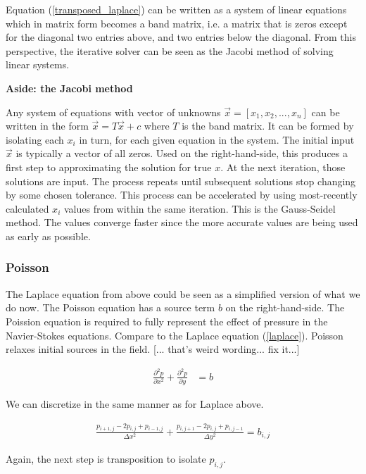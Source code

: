 \documentclass[11pt]{article}
\begin{document}
{Equation (\ref{transposed_laplace}) can be written as a system of linear equations which in
matrix form becomes a band matrix, i.e. a matrix that is zeros except for the diagonal
two entries above, and two entries below the diagonal. From this perspective, the iterative
solver can be seen as the Jacobi method of solving linear systems.

\textbf{Aside: the Jacobi method}

Any system of equations with vector of unknowns $\vec{x} = [x_1, x_2,... ,x_n]$ can be written
in the form $\vec{x} = T\vec{x} + c$ where $T$ is the band matrix. It can be formed by
isolating each $x_i$ in turn, for each given equation in the system. The initial input $\vec{x}$
is typically a vector of all zeros. Used on the right-hand-side, this produces a first step
to approximating the solution for true $x$. At the next iteration, those solutions are input.
The process repeats until subsequent solutions stop changing by some chosen tolerance.
This process can be accelerated by using most-recently calculated $x_i$ values from
within the same iteration. This is the Gauss-Seidel method. The values converge faster since
the more accurate values are being used as early as possible.

\subsubsection{Poisson}
The Laplace equation from above could be seen as a simplified version of what we do now.
The Poisson equation has a source term $b$ on the right-hand-side.
The Poission equation is required to fully represent the effect of pressure in
the Navier-Stokes equations. Compare to the Laplace equation (\ref{laplace}).
Poisson relaxes initial sources in the field.
[... that's weird wording... fix it...]

\begin{align}
\frac{\partial^2 p}{\partial x^2} + \frac{\partial^2 p}{\partial y} &= b
\label{poisson}
\end{align}

We can discretize in the same manner as for Laplace above.

\begin{align}
\frac{p_{i+1,j} - 2p_{i,j} + p_{i-1,j}}{\Delta x^2}
 + \frac{p_{i,j+1} - 2p_{i,j} + p_{i,j-1}}{\Delta y^2} = b_{i,j}
\label{discrete_poisson}
\end{align}

Again, the next step is transposition to isolate $p_{i,j}$.

}
\end{document}
